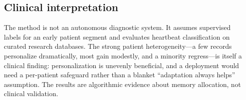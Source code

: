 \subsection{Clinical interpretation}

The method is not an autonomous diagnostic system. It assumes supervised labels
for an early patient segment and evaluates heartbeat classification on curated
research databases. The strong patient heterogeneity---a few records personalize
dramatically, most gain modestly, and a minority regress---is itself a clinical
finding: personalization is unevenly beneficial, and a deployment would need a
per-patient safeguard rather than a blanket ``adaptation always helps''
assumption. The results are algorithmic evidence about memory allocation, not
clinical validation.
